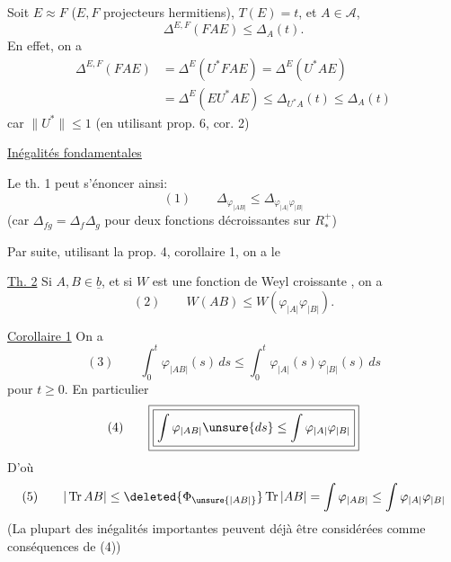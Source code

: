 \margin{$\Big|$}
Soit $E\approx F$ ($E,F$ projecteurs hermitiens), $T(E)=t$, et $A\in\mathcal A$, 
\[
\Delta^{E,F}(FAE)\leq\Delta_A(t).
\]
En effet, on a
\[
\begin{aligned}
\Delta^{E,F}(FAE)&=\Delta^E(U^*FAE)=\Delta^E(U^*AE)\\
&=\Delta^E(EU^*AE)\leq\Delta_{U^*A}(t)\leq\Delta_A(t)
\end{aligned}
\]
car $\|U^*\|\leq1$ (en utilisant prop. 6, cor. 2)

\uline{Inégalités fondamentales}

Le th. 1 peut s'énoncer ainsi:
\[
(1)\qquad\Delta_{\varphi_{|AB|}}\leq\Delta_{\varphi_{|A|}\varphi_{|B|}}
\]
(car $\Delta_{fg}=\Delta_f\Delta_g$ pour deux fonctions décroissantes sur  $R_*^+$)

Par suite, utilisant la prop. 4, corollaire 1, on a le

\uline{Th. 2} Si $A,B\in\underline b$,  et si $W$ est une fonction de Weyl croissante  , on a
\margin{$\Big|$}
\[
(2)\qquad W(AB)\leq W(\varphi_{|A|}\varphi_{|B|}).
\]

\uline{Corollaire 1} On a 
\margin{$\Big|$}
\[
(3)\qquad\int_0^t\varphi_{|AB|}(s)\,ds
\leq\int_0^t\varphi_{|A|}(s)\varphi_{|B|}(s)\,ds
\]
pour  $t\geq0$. En particulier
\[
(4)\qquad\boxed{\boxed{\int\varphi_{|AB|}\unsure{ds}\leq\int\varphi_{|A|}\varphi_{|B|}}}
\]
D'où
\[
(5)\qquad |\operatorname{Tr}AB|\leq\deleted{\Phi_{\unsure{|AB|}}}\operatorname{Tr}|AB|
=\int\varphi_{|AB|}\leq\int\varphi_{|A|}\varphi_{|B|}
\]
(La plupart des inégalités importantes peuvent déjà être considérées comme conséquences de (4))
